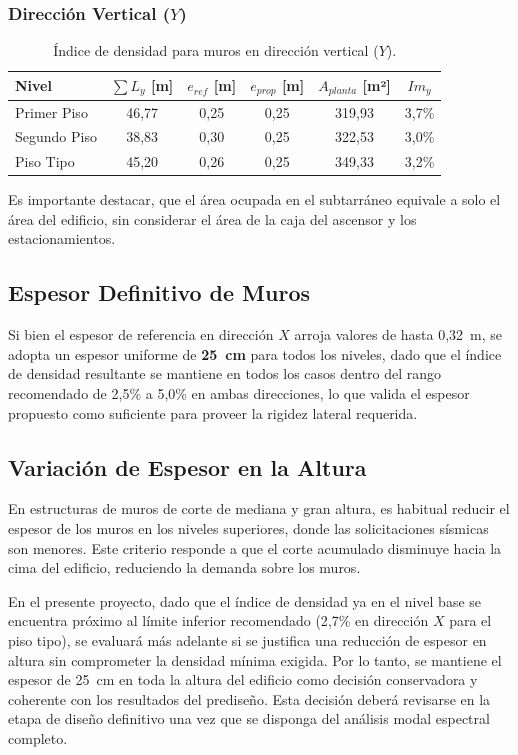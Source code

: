 \subsubsection{Dirección Vertical ($Y$)}

\begin{table}[H]
    \centering
    \begin{tabular}{lccccc}
        \toprule
        \textbf{Nivel} & 
        $\sum L_y$ \textbf{[m]} & 
        $e_{ref}$ \textbf{[m]} & 
        $e_{prop}$ \textbf{[m]} & 
        $A_{planta}$ \textbf{[m²]} & 
        $Im_y$ \\
        \midrule
        Primer Piso  & 46{,}77 & 0{,}25 & 0{,}25 & 319{,}93 & 3{,}7\% \\
        Segundo Piso & 38{,}83 & 0{,}30 & 0{,}25 & 322{,}53 & 3{,}0\% \\
        Piso Tipo    & 45{,}20 & 0{,}26 & 0{,}25 & 349{,}33 & 3{,}2\% \\
        \bottomrule
    \end{tabular}
    \caption{Índice de densidad para muros en dirección vertical ($Y$).}
    \label{tab:densidad_vert}
\end{table}

Es importante destacar, que el área ocupada en el subtarráneo equivale a solo el área del edificio, sin considerar el área de la caja del ascensor y los estacionamientos.

\subsection{Espesor Definitivo de Muros}

Si bien el espesor de referencia en dirección $X$ arroja valores de hasta 
0{,}32~m, se adopta un espesor uniforme de \textbf{25~cm} para todos los 
niveles, dado que el índice de densidad resultante se mantiene en todos 
los casos dentro del rango recomendado de 2{,}5\% a 5{,}0\% en ambas 
direcciones, lo que valida el espesor propuesto como suficiente para 
proveer la rigidez lateral requerida.

\subsection{Variación de Espesor en la Altura}

En estructuras de muros de corte de mediana y gran altura, es habitual 
reducir el espesor de los muros en los niveles superiores, donde las 
solicitaciones sísmicas son menores. Este criterio responde a que el 
corte acumulado disminuye hacia la cima del edificio, reduciendo la 
demanda sobre los muros.

En el presente proyecto, dado que el índice de densidad ya en el nivel 
base se encuentra próximo al límite inferior recomendado (2{,}7\% en 
dirección $X$ para el piso tipo), se evaluará más adelante si se justifica una reducción de 
espesor en altura sin comprometer la densidad mínima exigida. Por lo 
tanto, se mantiene el espesor de 25~cm en toda la altura del edificio 
como decisión conservadora y coherente con los resultados del prediseño. 
Esta decisión deberá revisarse en la etapa de diseño definitivo una vez 
que se disponga del análisis modal espectral completo.